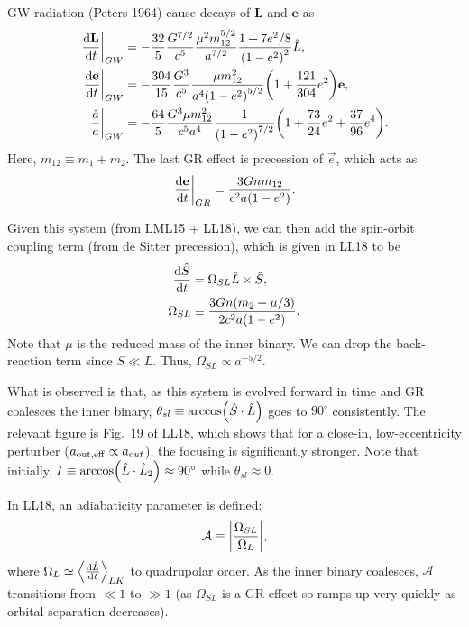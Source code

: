 \documentclass[11pt,
        usenames, %
        dvipsnames %
    ]{article}
\newcommand*{\rd}[2]{\frac{\mathrm{d}#1}{\mathrm{d}#2}}
\newcommand*{\bm}[1]{\boldsymbol{\mathbf{#1}}}
\newcommand*{\at}[1]{\left.#1\right|}
\DeclarePairedDelimiter\abs{\lvert}{\rvert}
\DeclarePairedDelimiter\ev{\langle}{\rangle}
\DeclarePairedDelimiter\p{\lparen}{\rparen}
\begin{document}
GW radiation (Peters 1964) cause decays of $\bm{L}$ and $\bm{e}$ as
\begin{align}
    \at{\rd{\bm{L}}{t}}_{GW} &= -\frac{32}{5}\frac{G^{7/2}}{c^5}
        \frac{\mu^2 m_{12}^{5/2}}{a^{7/2}}
        \frac{1 + 7e^2/8}{\p*{1 - e^2}^2}\hat{L},\\
    \at{\rd{\bm{e}}{t}}_{GW} &= -\frac{304}{15} \frac{G^3}{c^5}
        \frac{\mu m_{12}^2}{a^4\p*{1 - e^2}^{5/2}}\p*{1 + \frac{121}{304}
            e^2}\bm{e},\\
    \at{\frac{\dot{a}}{a}}_{GW} &= -\frac{64}{5} \frac{G^3 \mu m_{12}^2}{c^5a^4}
        \frac{1}{\p*{1 - e^2}^{7/2}}\p*{1 + \frac{73}{24}e^2
            + \frac{37}{96}e^4}.
\end{align}
Here, $m_{12} \equiv m_1 + m_2$. The last GR effect is precession of $\vec{e}$,
which acts as
\begin{equation}
    \at{\rd{\bm{e}}{t}}_{GR} = \frac{3Gnm_{12}}{c^2a\p*{1 - e^2}}.
\end{equation}

Given this system (from LML15 + LL18), we can then add the spin-orbit coupling
term (from de Sitter precession), which is given in LL18 to be
\begin{align}
    \rd{\hat{S}}{t} &= \Omega_{SL}\hat{L} \times \hat{S},\\
    \Omega_{SL} &\equiv \frac{3Gn\p*{m_2 + \mu/3}}{2c^2a\p*{1 - e^2}}.
\end{align}
Note that $\mu$ is the reduced mass of the inner binary. We can drop the
back-reaction term since $S \ll L$. Thus, $\Omega_{SL} \propto a^{-5/2}$.

What is observed is that, as this system is evolved forward in time and GR
coalesces the inner binary, $\theta_{sl} \equiv \arccos\p*{\hat{S} \cdot
\hat{L}}$ goes to $90^\circ$ consistently. The relevant figure is Fig.~19 of
LL18, which shows that for a close-in, low-eccentricity perturber ($\bar{a}_{\rm
out, eff} \propto a_{out}$), the focusing is significantly stronger. Note that
initially, $I \equiv \arccos\p*{\hat{L} \cdot \hat{L}_2} \approx 90^\circ$ while
$\theta_{sl} \approx 0$.

In LL18, an adiabaticity parameter is defined:
\begin{equation}
    \mathcal{A} \equiv \abs*{\frac{\Omega_{SL}}{\Omega_L}},
\end{equation}
where $\Omega_{L} \simeq \ev*{\rd{\hat{L}}{t}}_{LK}$ to quadrupolar order. As
the inner binary coalesces, $\mathcal{A}$ transitions from $\ll 1$ to $\gg 1$
(as $\Omega_{SL}$ is a GR effect so ramps up very quickly as orbital separation
decreases).
\end{document}
